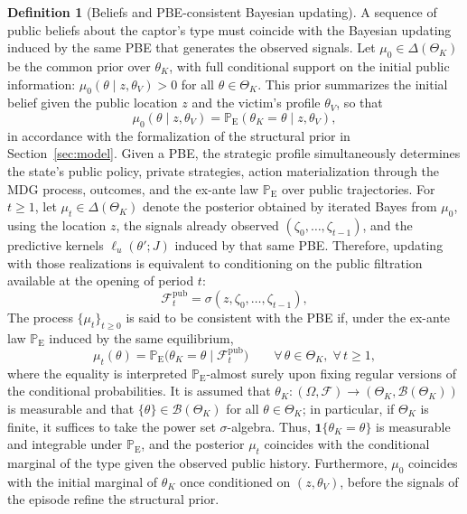 \documentclass[pdflatex,sn-mathphys-ay]{sn-jnl}
\theoremstyle{plain}
\theoremstyle{definition}
\newtheorem{definition}[theorem]{Definition}
\newcommand{\ProbE}{\mathbb{P}_{\mathrm{E}}}
\newcommand{\ThetaK}{\Theta_K}
\newcommand{\1}{\mathbf{1}}
\begin{document}
\begin{definition}[Beliefs and PBE-consistent Bayesian updating]\label{def:beliefs-martingale}
A sequence of public beliefs about the captor's type must coincide with the Bayesian updating induced by the same PBE that generates the observed signals. Let $\mu_0\in\Delta(\ThetaK)$ be the common prior over $\theta_K$, with full conditional support on the initial public information: $\mu_0(\theta \mid z,\theta_V)>0$ for all $\theta\in\ThetaK$. This prior summarizes the initial belief given the public location $z$ and the victim's profile $\theta_V$, so that
\[
\mu_0(\theta \mid z,\theta_V)=\ProbE(\theta_K=\theta\mid z,\theta_V),
\]
in accordance with the formalization of the structural prior in Section~\ref{sec:model}. Given a PBE, the strategic profile simultaneously determines the state's public policy, private strategies, action materialization through the MDG process, outcomes, and the ex-ante law $\ProbE$ over public trajectories. For $t\ge 1$, let $\mu_t\in\Delta(\ThetaK)$ denote the posterior obtained by iterated Bayes from $\mu_0$, using the location $z$, the signals already observed $(\zeta_0,\ldots,\zeta_{t-1})$, and the predictive kernels $\ell_u(\theta';J)$ induced by that same PBE. Therefore, updating with those realizations is equivalent to conditioning on the public filtration available at the opening of period $t$:
\[
\mathcal{F}_t^{\mathrm{pub}}=\sigma(z,\zeta_0,\ldots,\zeta_{t-1}),
\]
The process $\{\mu_t\}_{t\ge 0}$ is said to be consistent with the PBE if, under the ex-ante law $\ProbE$ induced by the same equilibrium,
\begin{equation}
\label{eq:beliefs-ebp-consistency}
\mu_t(\theta)=\ProbE\bigl(\theta_K=\theta\mid\mathcal{F}_t^{\mathrm{pub}}\bigr)\qquad \forall\,\theta\in\ThetaK,\;\forall\,t\ge 1,
\end{equation}
where the equality is interpreted $\ProbE$-almost surely upon fixing regular versions of the conditional probabilities. It is assumed that $\theta_K:(\Omega,\mathcal{F})\to(\ThetaK,\mathcal{B}(\ThetaK))$ is measurable and that $\{\theta\}\in\mathcal{B}(\ThetaK)$ for all $\theta\in\ThetaK$; in particular, if $\ThetaK$ is finite, it suffices to take the power set $\sigma$-algebra. Thus, $\mathbf{1}\{\theta_K=\theta\}$ is measurable and integrable under $\ProbE$, and the posterior $\mu_t$ coincides with the conditional marginal of the type given the observed public history. Furthermore, $\mu_0$ coincides with the initial marginal of $\theta_K$ once conditioned on $(z, \theta_V)$, before the signals of the episode refine the structural prior.
\end{definition}
\end{document}

